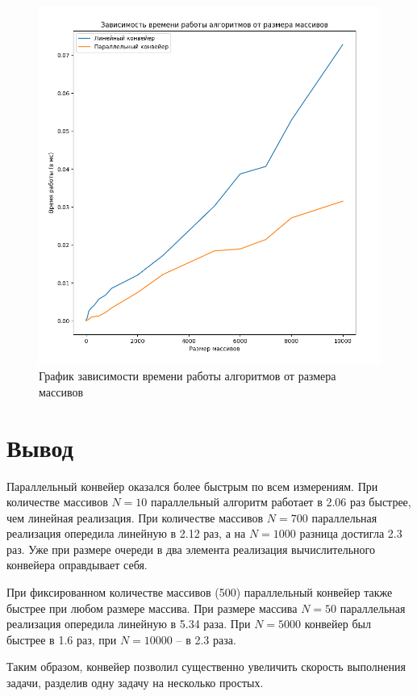 \FloatBarrier
\begin{figure}[h]
	\begin{center}
		\includegraphics[width=\linewidth]{inc/size.png}
	\end{center}
	\caption{График зависимости времени работы алгоритмов от размера массивов}
\end{figure}
\FloatBarrier

\section{Вывод}
Параллельный конвейер оказался более быстрым по всем измерениям. 
При количестве массивов $ N = 10 $ параллельный алгоритм работает в 2.06 раз быстрее, чем линейная реализация.
При количестве массивов $ N = 700 $ параллельная реализация опередила линейную в 2.12 раз, а на 
$ N = 1000 $ разница достигла 2.3 раз.
Уже при размере очереди в два элемента реализация вычислительного конвейера оправдывает себя.

При фиксированном количестве массивов (500) параллельный конвейер также быстрее при любом размере массива.
При размере массива $ N = 50 $ параллельная реализация опередила линейную в 5.34 раза. 
При $ N = 5000 $ конвейер был быстрее в 1.6 раз, при $ N = 10000 $ --  в 2.3 раза.

Таким образом, конвейер позволил существенно увеличить скорость выполнения задачи, разделив 
одну задачу на несколько простых.